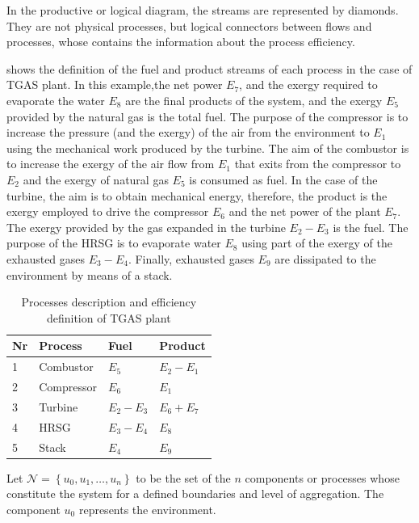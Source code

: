\documentclass{ecos2018}
\begin{document}
In the productive or logical diagram, the streams are represented by diamonds. They are not physical processes, but logical connectors between flows and processes, whose contains the information about the process efficiency.

 shows the definition of the fuel and product streams of each process in the case of TGAS plant. In this example,the net power $E_7$, and the exergy required to evaporate the water $E_8$ are the final products of the system, and the exergy $E_5$ provided by the natural gas is the total fuel. The purpose of the compressor is to increase the pressure (and the exergy) of the air from the environment to $E_1$ using the mechanical work produced by the turbine. The aim of the combustor is to increase the exergy of the air flow from $E_1$ that exits from the compressor to $E_2$ and the exergy of natural gas $E_5$ is consumed as fuel.
In the case of the turbine, the aim is to obtain mechanical energy, therefore, the product is the exergy employed to drive the compressor $E_6$ and the net power of the plant $E_7$. The exergy provided by the gas expanded in the turbine $E_2 - E_3$ is the fuel. The purpose of the HRSG is to evaporate water $E_8$ using part of the exergy of the exhausted gases $E_3 - E_4$. Finally, exhausted gases $E_9$ are dissipated to the environment by means of a stack.

\begin{table}[H]
	\caption{Processes description and efficiency definition of TGAS plant}	
	\label{tab1}
	\begin{tabularx}{0.75\textwidth}{B{1.5cm}WZZ}
		\toprule
		Nr & Process & Fuel  & Product  \\ 
		  & Combustor  & $E_5$     & $E_2-E_1$ \\ 
		2  & Compressor & $E_6$     & $E_1$     \\ 
		3  & Turbine    & $E_2-E_3$ & $E_6+E_7$ \\ 
		4  & HRSG       & $E_3-E_4$ & $E_8$     \\ 
		5  & Stack      & $E_4$     & $E_9$     \\ 
		\bottomrule 
	\end{tabularx} 
\end{table}

Let $\mathcal{N}=\left\{u_0,u_1,\ldots,u_n\right\}$ to be the set of the $n$ components or processes whose constitute the system for a defined boundaries and level of aggregation. The component $u_0$ represents the environment.
\end{document}
